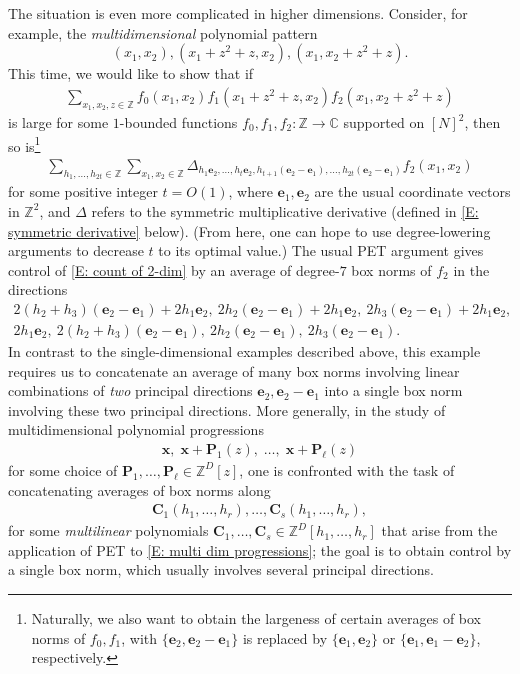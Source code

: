 \documentclass[11pt]{amsart}
\theoremstyle{definition}
\newcommand{\C}{{\mathbb C}}
\newcommand{\Z}{{\mathbb Z}}
\newcommand{\bc}{{\mathbf{C}}}
\newcommand{\be}{{\mathbf{e}}}
\newcommand{\p}{{\mathbf{P}}}
\newcommand{\bx}{{\mathbf{x}}}
\begin{document}
The situation is even more complicated in higher dimensions.  Consider, for example, the \textit{multidimensional} polynomial pattern
\begin{equation}\label{E: 2-dim prog}
(x_1, x_2), (x_1 + z^2+z, x_2), (x_1, x_2 + z^2 + z).    
\end{equation}
This time, we 
would like to show that if
\begin{align}\label{E: count of 2-dim}
    \sum_{x_1,x_2,z\in\Z}f_0(x_1, x_2)f_1(x_1 + z^2 + z, x_2)f_2(x_1, x_2 + z^2 + z)
\end{align}
is large 
for some $1$-bounded functions $f_0, f_1, f_2:\Z\to\C$ supported on $[N]^2$, then so is\footnote{Naturally, we also want to obtain the largeness of certain averages of box norms of $f_0, f_1$, with $\{\be_2,\be_2-\be_1\}$ is replaced by $\{\be_1, \be_2\}$ or $\{\be_1, \be_1-\be_2\}$, respectively.}
\begin{align*}
    \sum_{h_1, \ldots, h_{2t}\in\Z}\sum_{x_1,x_2\in\Z}\Delta_{h_1 \be_2, \ldots, h_t \be_2, h_{t+1}(\be_2 - \be_1), \ldots, h_{2t}(\be_2 - \be_1)}f_2(x_1, x_2)
\end{align*}
for some positive integer $t=O(1)$, where $\be_1, \be_2$ are the usual coordinate vectors in $\mathbb{Z}^2$, and $\Delta$ refers to the symmetric multiplicative derivative (defined in \eqref{E: symmetric derivative} below).  (From here, one can hope to use degree-lowering arguments to decrease $t$ to  its optimal value.)  The usual PET argument gives control of \eqref{E: count of 2-dim} by an average of degree-$7$ box norms of $f_2$ in the directions
\begin{gather}\label{E: examplealgebraicdirections}
    2(h_2+h_3)(\be_2 - \be_1) + 2h_1 \be_2,\ 2h_2(\be_2 - \be_1) + 2h_1 \be_2,\ 2 h_3(\be_2 - \be_1) + 2h_1 \be_2,\\ 
    \nonumber 2h_1 \be_2,\ 2(h_2+h_3)(\be_2 - \be_1),\ 2h_2(\be_2 - \be_1),\  2h_3(\be_2 - \be_1).
\end{gather}
In contrast to the single-dimensional examples described above, this example requires us to concatenate an average of many box norms involving {linear combinations} of \emph{two} principal directions $\be_2, \be_2-\be_1$ into a single box norm involving  these {two} principal directions. 
More generally, in the study of multidimensional polynomial progressions
\begin{align}\label{E: multi dim progressions}
    \bx, \; \bx + \p_1(z),\; \ldots,\; \bx + \p_\ell(z)
\end{align} 
for some choice of $\p_1, \ldots, \p_\ell\in\Z^D[z]$, one is confronted with the task of concatenating averages of box norms along
\begin{align}\label{E: multi dim directions general}
    \bc_1(h_1, \ldots, h_r), \ldots,\bc_s(h_1, \ldots, h_r),
\end{align}
for some \emph{multilinear} polynomials $\bc_1, \ldots, \bc_s\in\Z^D[h_1, \ldots, h_r]$ that arise from the application of PET to \eqref{E: multi dim progressions}; the goal is to obtain control by a single box norm, which usually involves several principal directions.
\end{document}
